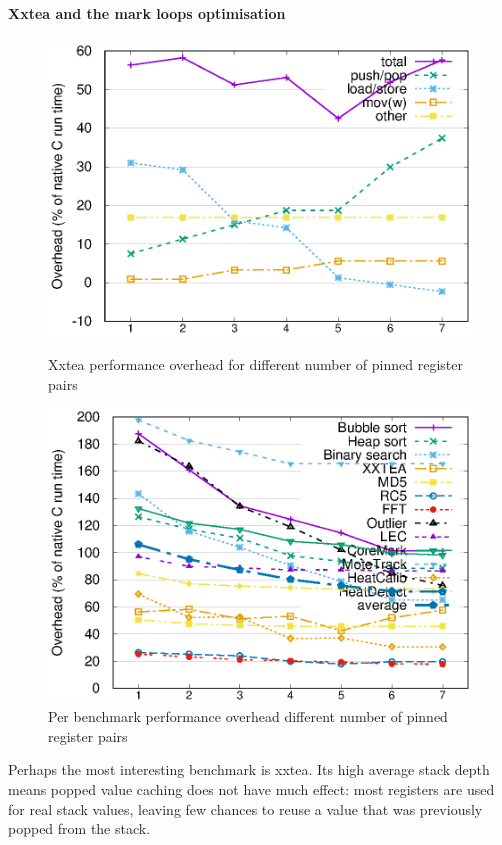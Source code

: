 \paragraph{Xxtea and the mark loops optimisation}
\begin{figure}
 \centering
 \begin{minipage}{0.45\textwidth}
  \centering
  \includegraphics[width=\myfiguresizexxtea]{pinnedregs-performance-xxtea.eps}
  \caption{Xxtea performance overhead for different number of pinned register pairs}
  \label{fig-performance-pinnedregs-xxtea-per-opcode-category}
 \end{minipage}\hfill
 \begin{minipage}{0.45\textwidth}
  \centering
  \includegraphics[width=\myfiguresizexxtea]{pinnedregs-performance-all-benchmarks.eps}
  \caption{Per benchmark performance overhead different number of pinned register pairs}
  \label{fig-performance-pinnedregs-per-benchmark}
 \end{minipage}
\end{figure}
Perhaps the most interesting benchmark is xxtea. Its high average stack depth means popped value caching does not have much effect: most registers are used for real stack values, leaving few chances to reuse a value that was previously popped from the stack. 

